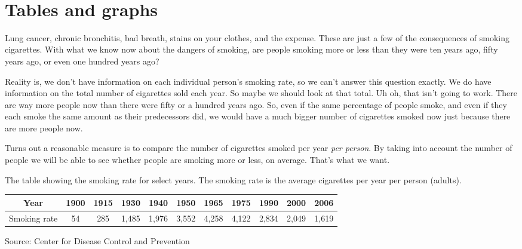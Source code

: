 ~\vspace{.1in}

\section{Tables and graphs}

Lung cancer, chronic bronchitis, bad breath, stains on your clothes, and the expense.  These are just a few of the consequences of smoking cigarettes. With what we know now about the dangers of smoking, are people smoking more or less than they were ten years ago, fifty years ago, or even one hundred years ago?  

Reality is, we don't have information on each individual person's smoking rate, so we can't answer this question exactly.  We do have information on the total number of cigarettes sold each year.  So maybe we should look at that total. Uh oh, that isn't going to work.  There are way more people now than there were fifty or a hundred years ago.  So, even if the same percentage of people smoke, and even if they each smoke the same amount as their predecessors did, we would have a much bigger number of cigarettes smoked now just because there are more people now.  

Turns out a reasonable measure is to compare the number of cigarettes smoked per year \emph{per person}.  By taking into account the number of people we will be able to see whether people are smoking more or less, on average. That's what we want.  

The table showing the smoking rate for select years.   The smoking rate is the average cigarettes per year per person (adults).
\begin{center}
\begin{tabular} {|c| |c|c|c|c|c|c|c|c|c|c|} \hline
Year & 1900 & 1915 & 1930 & 1940 & 1950 & 1965 & 1975 & 1990 & 2000 & 2006 \\ \hline
Smoking rate & 54 & 285 & 1,485& 1,976 & 3,552 &  4,258 &  4,122 &  2,834 &  2,049 &  1,619 \\ \hline
\end{tabular}
\end{center}
\hfill \begin{footnotesize} Source:  Center for Disease Control and Prevention \end{footnotesize}
\bigskip 

